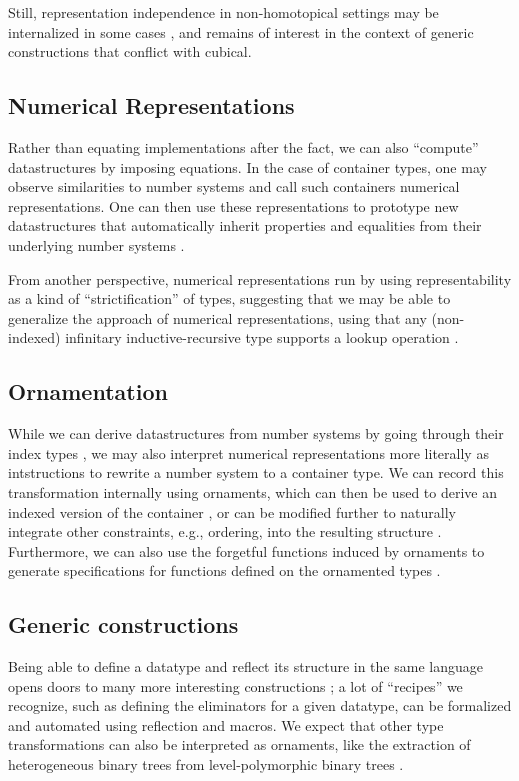 \documentclass[10pt]{article}
\theoremstyle{plain}%
\theoremstyle{definition}
\begin{document}
Still, representation independence in non-homotopical settings may be internalized in some cases \cite{tgalois}, and remains of interest in the context of generic constructions that conflict with cubical.

\subsection{Numerical Representations}
Rather than equating implementations after the fact, we can also ``compute'' datastructures by imposing equations. In the case of container types, one may observe similarities to number systems \cite{purelyfunctional} and call such containers numerical representations. One can then use these representations to prototype new datastructures that automatically inherit properties and equalities from their underlying number systems \cite{calcdata}.

From another perspective, numerical representations run by using representability as a kind of ``strictification'' of types, suggesting that we may be able to generalize the approach of numerical representations, using that any (non-indexed) infinitary inductive-recursive type supports a lookup operation \cite{glookup}.


\subsection{Ornamentation}
While we can derive datastructures from number systems by going through their index types \cite{calcdata}, we may also interpret numerical representations more literally as intstructions to rewrite a number system to a container type. We can record this transformation internally using ornaments, which can then be used to derive an indexed version of the container \cite{algorn}, or can be modified further to naturally integrate other constraints, e.g., ordering, into the resulting structure \cite{progorn}. Furthermore, we can also use the forgetful functions induced by ornaments to generate specifications for functions defined on the ornamented types \cite{orntrans}.

\subsection{Generic constructions}
Being able to define a datatype and reflect its structure in the same language opens doors to many more interesting constructions \cite{practgen}; a lot of ``recipes'' we recognize, such as defining the eliminators for a given datatype, can be formalized and automated using reflection and macros. We expect that other type transformations can also be interpreted as ornaments, like the extraction of heterogeneous binary trees from level-polymorphic binary trees \cite{hetbin}. 
\end{document}
